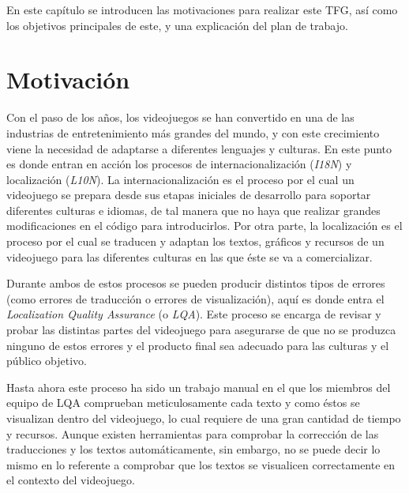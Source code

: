 
En este capítulo se introducen las motivaciones para realizar este TFG, así como los objetivos principales de este, y una explicación del plan de trabajo. 

\section{Motivación}
Con el paso de los años, los videojuegos se han convertido en una de las industrias de entretenimiento más grandes del mundo, y con este crecimiento viene la necesidad de adaptarse a diferentes lenguajes y culturas.
En este punto es donde entran en acción los procesos de internacionalización (\textit{I18N}) y localización (\textit{L10N}).
La internacionalización es el proceso por el cual un videojuego se prepara desde sus etapas iniciales de desarrollo para soportar diferentes culturas e idiomas, de tal manera que no haya que realizar grandes modificaciones en el código para introducirlos.
Por otra parte, la localización es el proceso por el cual se traducen y adaptan los textos, gráficos y recursos de un videojuego para las diferentes culturas en las que éste se va a comercializar.

Durante ambos de estos procesos se pueden producir distintos tipos de errores (como errores de traducción o errores de visualización), aquí es donde entra el \textit{Localization Quality Assurance} (o \textit{LQA}). Este proceso se encarga de revisar y probar las distintas partes del videojuego para asegurarse de que no se produzca ninguno de estos errores y el producto final sea adecuado para las culturas y el público objetivo.

Hasta ahora este proceso ha sido un trabajo manual en el que los miembros del equipo de LQA comprueban meticulosamente cada texto y como éstos se visualizan dentro del videojuego, lo cual requiere de una gran cantidad de tiempo y recursos. Aunque existen herramientas para comprobar la corrección de las traducciones y los textos automáticamente, sin embargo, no se puede decir lo mismo en lo referente a comprobar que los textos se visualicen correctamente en el contexto del videojuego.

